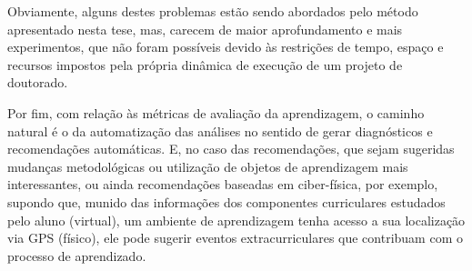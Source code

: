 Obviamente, alguns destes problemas estão sendo abordados pelo método apresentado nesta tese, mas, carecem de maior aprofundamento e mais experimentos, que não foram possíveis devido às restrições de tempo, espaço e recursos impostos pela própria dinâmica de execução de um projeto de doutorado. 

Por fim, com relação às métricas de avaliação da aprendizagem, o caminho natural é o da automatização das análises no sentido de gerar diagnósticos e recomendações automáticas. E, no caso das recomendações, que sejam sugeridas mudanças metodológicas ou utilização de objetos de aprendizagem mais interessantes, ou ainda recomendações baseadas em ciber-física, por exemplo, supondo que, munido das informações dos componentes curriculares estudados pelo aluno (virtual), um ambiente de aprendizagem tenha acesso a sua localização via GPS (físico), ele pode sugerir eventos extracurriculares que contribuam com o processo de aprendizado.